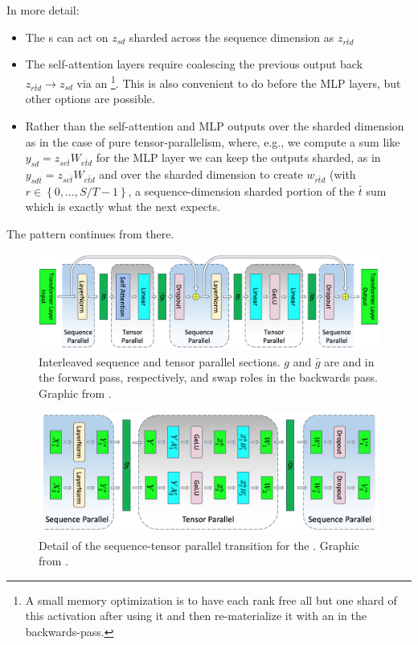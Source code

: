 \documentclass[11pt]{article}
\begin{document}
In more detail:
\begin{itemize}
    \item The s can act on $ z _{ sd } $ sharded across the sequence dimension
        as $ z _{ r \bar{t}d } $
    \item The self-attention layers require coalescing the previous
        output back $ z _{ r \bar{t}d }\longrightarrow z _{ sd } $ via an
        \footnote{A small memory optimization is to have each rank free all but
        one shard of this activation after using it and then re-materialize it with an
     in the backwards-pass.}. This is also convenient to do before the MLP layers,
    but other options are possible.
    \item Rather than  the self-attention and MLP outputs over the sharded
    dimension as in the case of pure tensor-parallelism, where, e.g.,  we compute a sum like $ y _{
    sd } = z _{ se \bar{t} } W _{ e \bar{t}d }$ for the MLP layer we can keep the outputs sharded,
    as in $ y _{ sd \bar{t} } = z _{ se \bar{t} } W _{ e \bar{t}d }$ and 
    over the sharded dimension to create $ w _{ r \bar{t}d } $ (with $ r \in \left \{ 0, \ldots ,
S/T-1 \right \} $, a sequence-dimension sharded portion of the  $ \bar{t} $ sum which is exactly
what the next   expects.
\end{itemize}
The pattern continues from there.

\begin{figure}[ht]
	\centering
	\includegraphics[scale=.25]{figures/transformer-tensor-sequence-parallel.jpg}
    \caption{Interleaved sequence and tensor parallel sections. $ g $ and $ \bar{g} $ are
     and   in the forward pass, respectively, and swap
roles in the backwards pass. Graphic from \cite{shoeybi2020megatronlm}. }
	\label{fig_tensor_seq_parallel}
\end{figure}

\begin{figure}[ht]
	\centering
	\includegraphics[scale=.25]{figures/mlp-tensor-sequence-parallel.jpg}
	\caption{Detail of the sequence-tensor parallel transition for the  . Graphic from
		\cite{shoeybi2020megatronlm}. }
	\label{fig_tensor_seq_parallel_detail}
\end{figure}
\end{document}
